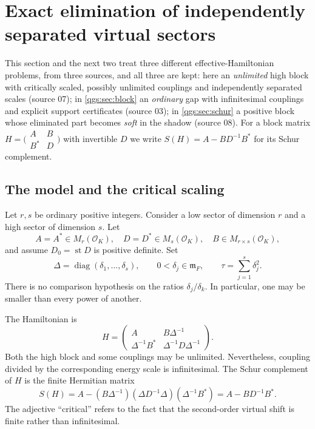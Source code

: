 \documentclass[11pt,oneside]{article}
\numberwithin{equation}{section}
\theoremstyle{plain}
\theoremstyle{definition}
\theoremstyle{remark}
\newcommand{\OO}{\mathcal O}
\newcommand{\mm}{\mathfrak m}
\DeclareMathOperator{\st}{st}
\DeclareMathOperator{\diag}{diag}
\begin{document}
\section{Exact elimination of independently separated virtual sectors}\label{qgs:sec:elimination}
This section and the next two treat three different effective-Hamiltonian problems, from three sources, and all three are kept: here an \emph{unlimited} high block with critically scaled, possibly unlimited couplings and independently separated scales (source 07); in \cref{qgs:sec:block} an \emph{ordinary} gap with infinitesimal couplings and explicit support certificates (source 03); in \cref{qgs:sec:schur} a positive block whose eliminated part becomes \emph{soft} in the shadow (source 08). For a block matrix $H=\bigl(\begin{smallmatrix}A&B\\B^*&D\end{smallmatrix}\bigr)$ with invertible $D$ we write $S(H)=A-BD^{-1}B^*$ for its Schur complement.

\subsection{The model and the critical scaling}
Let $r,s$ be ordinary positive integers. Consider a low sector of dimension $r$ and a high sector of dimension $s$. Let
\[
 A=A^*\in M_r(\OO_K),\quad
 D=D^*\in M_s(\OO_K),\quad
 B\in M_{r\times s}(\OO_K),
\]
and assume $D_0=\st D$ is positive definite. Set
\begin{equation}\label{qgs:eq:Delta}
 \Delta=\diag(\delta_1,\ldots,\delta_s),
 \qquad 0<\delta_j\in\mm_F,
 \qquad \tau=\sum_{j=1}^s\delta_j^2.
\end{equation}
There is no comparison hypothesis on the ratios $\delta_j/\delta_k$. In particular, one may be smaller than every power of another.

The Hamiltonian is
\begin{equation}\label{qgs:eq:criticalH}
 H=\begin{pmatrix}
 A&B\Delta^{-1}\\
 \Delta^{-1}B^*&\Delta^{-1}D\Delta^{-1}
 \end{pmatrix}.
\end{equation}
Both the high block and some couplings may be unlimited. Nevertheless, coupling divided by the corresponding energy scale is infinitesimal. The Schur complement of $H$ is the finite Hermitian matrix
\begin{equation}\label{qgs:eq:Kzero}
 S(H)=A-(B\Delta^{-1})(\Delta D^{-1}\Delta)(\Delta^{-1}B^*)=A-BD^{-1}B^*.
\end{equation}
The adjective ``critical'' refers to the fact that the second-order virtual shift is finite rather than infinitesimal.
\end{document}

